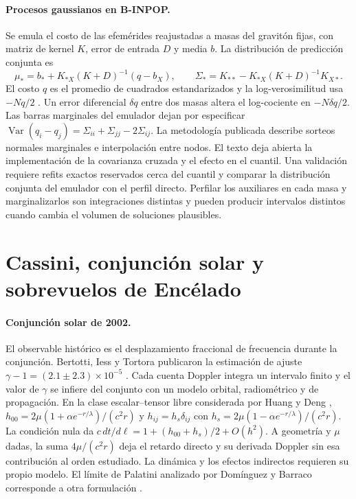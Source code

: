 \documentclass[11pt,a4paper]{article}
\begin{document}
\paragraph{Procesos gaussianos en B-INPOP.} Se emula el costo de las efemérides reajustadas a masas del gravitón fijas, con matriz de kernel $K$, error de entrada $D$ y media $b$. La distribución de predicción conjunta es
\begin{equation}
\mu_*=b_*+K_{*X}(K+D)^{-1}(q-b_X),\qquad
\Sigma_*=K_{**}-K_{*X}(K+D)^{-1}K_{X*}.
\end{equation}
El costo $q$ es el promedio de cuadrados estandarizados y la log-verosimilitud usa $-Nq/2$ \cite{mariani,marianimethod}. Un error diferencial $\delta q$ entre dos masas altera el log-cociente en $-N\delta q/2$. Las barras marginales del emulador dejan por especificar $\operatorname{Var}(q_i-q_j)=\Sigma_{ii}+\Sigma_{jj}-2\Sigma_{ij}$. La metodología publicada describe sorteos normales marginales e interpolación entre nodos. El texto deja abierta la implementación de la covarianza cruzada y el efecto en el cuantil. Una validación requiere refits exactos reservados cerca del cuantil y comparar la distribución conjunta del emulador con el perfil directo. Perfilar los auxiliares en cada masa y marginalizarlos son integraciones distintas y pueden producir intervalos distintos cuando cambia el volumen de soluciones plausibles.

\section{Cassini, conjunción solar y sobrevuelos de Encélado}
\label{sec:cassini}
\paragraph{Conjunción solar de 2002.} El observable histórico es el desplazamiento fraccional de frecuencia durante la conjunción. Bertotti, Iess y Tortora publicaron la estimación de ajuste $\gamma-1=(2.1\pm2.3)\times10^{-5}$ \cite{bertotti}. Cada cuenta Doppler integra un intervalo finito y el valor de $\gamma$ se infiere del conjunto con un modelo orbital, radiométrico y de propagación. En la clase escalar--tensor libre considerada por Huang y Deng \cite{huang,zhang}, $h_{00}=2\mu(1+\alpha e^{-r/\lambda})/(c^2r)$ y $h_{ij}=h_s\delta_{ij}$ con $h_s=2\mu(1-\alpha e^{-r/\lambda})/(c^2r)$. La condición nula da $c\,dt/d\ell=1+(h_{00}+h_s)/2+O(h^2)$. A geometría y $\mu$ dadas, la suma $4\mu/(c^2r)$ deja el retardo directo y su derivada Doppler sin esa contribución al orden estudiado. La dinámica y los efectos indirectos requieren su propio modelo. El límite de Palatini analizado por Domínguez y Barraco corresponde a otra formulación \cite{barraco}.
\end{document}
